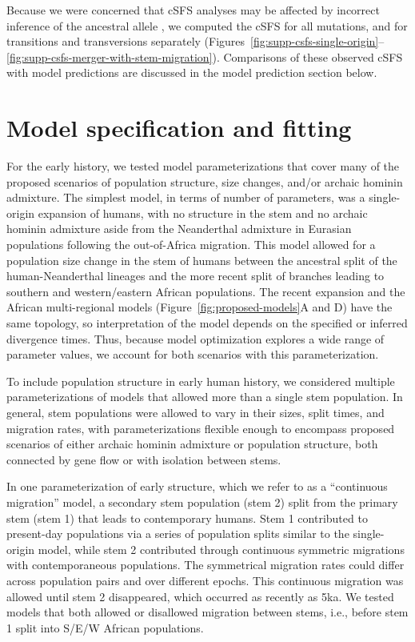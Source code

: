\documentclass[]{article}
\begin{document}
Because we were concerned that cSFS analyses may be affected by incorrect
inference of the ancestral allele \citep{Hernandez2007-mf}, we computed the cSFS
for all mutations, and for transitions and transversions separately
(Figures~\ref{fig:supp-csfs-single-origin}--\ref{fig:supp-csfs-merger-with-stem-migration}).
Comparisons of these observed cSFS with model
predictions are discussed in the model prediction section below. 

\section{Model specification and fitting}
\label{modelspec}

For the early history, we tested model parameterizations that cover many of the
proposed scenarios of population structure, size changes, and/or archaic
hominin admixture. The simplest model, in terms of number of parameters, was a
single-origin expansion of humans, with no structure in the stem and no archaic
hominin admixture aside from the Neanderthal admixture in Eurasian populations
following the out-of-Africa migration. This model allowed for a population size
change in the stem of humans between the ancestral split of the
human-Neanderthal lineages and the more recent split of branches leading to
southern and western/eastern African populations. The recent expansion and the
African multi-regional models (Figure~\ref{fig:proposed-models}A and D) have
the same topology, so interpretation of the model depends on the specified or
inferred divergence times. Thus, because model optimization explores a wide
range of parameter values, we account for both scenarios with this
parameterization.

To include population structure in early human history, we considered multiple
parameterizations of models that allowed more than a single stem population. In
general, stem populations were allowed to vary in their sizes, split times, and
migration rates, with parameterizations flexible enough to encompass proposed
scenarios of either archaic hominin admixture or population structure, both connected
by gene flow or with isolation between stems.

In one parameterization of early structure, which we refer to as a “continuous
migration” model, a secondary stem population (stem 2) split from the primary
stem (stem 1) that leads to contemporary humans. Stem 1 contributed to present-day
populations via a series of population splits similar to the single-origin
model, while stem 2 contributed through continuous symmetric migrations with
contemporaneous populations. The symmetrical migration rates could differ
across population pairs and over different epochs. This continuous migration
was allowed until stem 2 disappeared, which occurred as recently as 5ka. We
tested models that both allowed or disallowed migration between stems, i.e.,
before stem 1 split into S/E/W African populations.
\end{document}

